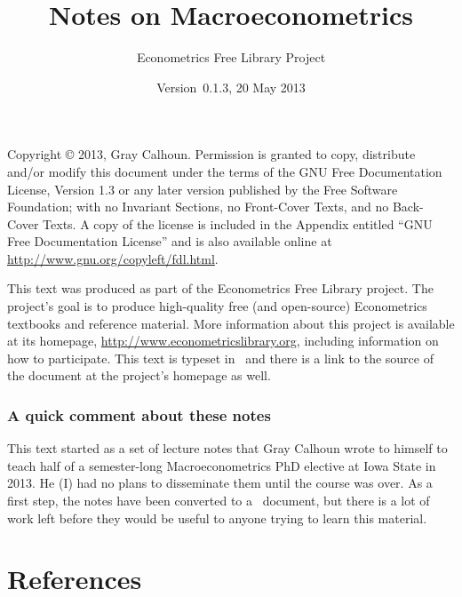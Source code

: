 \documentclass{tex/tufte-handout}
\title{Notes on Macroeconometrics}
\author{Econometrics Free Library Project}
\date{Version~0.1.3, 20 May 2013}
\begin{document}
\maketitle

\bigskip\noindent%
Copyright © 2013, Gray Calhoun.  Permission is granted to copy,
distribute and/or modify this document under the terms of the GNU Free
Documentation License, Version 1.3 or any later version published by
the Free Software Foundation; with no Invariant Sections, no
Front-Cover Texts, and no Back-Cover Texts.  A copy of the license is
included in the Appendix entitled ``GNU Free Documentation License''
and is also available online at
\url{http://www.gnu.org/copyleft/fdl.html}.

This text was produced as part of the Econometrics Free Library
project.  The project's goal is to produce high-quality free (and
open-source) Econometrics textbooks and reference material.  More
information about this project is available at its homepage,
\url{http://www.econometricslibrary.org}, including information on how
to participate.  This text is typeset in \XeLaTeX\ and there is a link
to the source of the document at the project's homepage as well.

\tableofcontents

\section{A quick comment about these notes}
This text started as a set of lecture notes that Gray Calhoun wrote to
himself to teach half of a semester-long Macroeconometrics PhD
elective at Iowa State in 2013.  He (I) had no plans to disseminate
them until the course was over.  As a first step, the notes have been
converted to a \XeLaTeX\ document, but there is a lot of work left
before they would be useful to anyone trying to learn this material.






\appendix


\part*{References}


\end{document}
